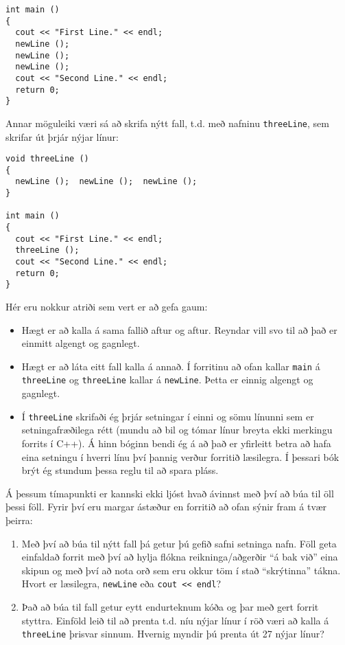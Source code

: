 \begin{verbatim}
int main ()
{
  cout << "First Line." << endl;
  newLine ();
  newLine ();
  newLine ();
  cout << "Second Line." << endl;
  return 0;
}
\end{verbatim}
%
Annar möguleiki væri sá að skrifa nýtt fall, t.d. með nafninu {\tt threeLine}, sem skrifar út þrjár nýjar línur: 

\begin{verbatim}
void threeLine ()
{
  newLine ();  newLine ();  newLine ();
}

int main ()
{
  cout << "First Line." << endl;
  threeLine ();
  cout << "Second Line." << endl;
  return 0;
}
\end{verbatim}
%
Hér eru nokkur atriði sem vert er að gefa gaum:

\begin{itemize}

\item Hægt er að kalla á sama fallið aftur og aftur. Reyndar vill svo til að það er einmitt algengt og gagnlegt.

\item Hægt er að láta eitt fall kalla á annað.
Í forritinu að ofan kallar {\tt main} á {\tt threeLine} og {\tt threeLine} kallar á {\tt newLine}.
Þetta er einnig algengt og gagnlegt. 

\item Í {\tt threeLine} skrifaði ég þrjár setningar í einni og sömu línunni sem er setningafræðilega rétt (mundu að bil og tómar línur breyta ekki merkingu forrits í C++).
Á hinn bóginn bendi ég á að það er yfirleitt betra að hafa eina setningu í hverri línu því þannig verður forritið læsilegra.
Í þessari bók brýt ég stundum þessa reglu til að spara pláss.

\end{itemize}

Á þessum tímapunkti er kannski ekki ljóst hvað ávinnst með því að búa til öll þessi föll.
Fyrir því eru margar ástæður en forritið að ofan sýnir fram á tvær þeirra:

\begin{enumerate}

\item Með því að búa til nýtt fall þá getur þú gefið safni setninga nafn.
Föll geta einfaldað forrit með því að hylja flókna reikninga/aðgerðir ``á bak við'' eina skipun og með því að nota orð sem eru okkur töm í stað ``skrýtinna'' tákna.
Hvort er læsilegra, {\tt newLine} eða {\tt cout << endl}?

\item Það að búa til fall getur eytt endurteknum kóða og þar með gert forrit styttra.
Einföld leið til að prenta t.d. níu nýjar línur í röð væri að kalla á {\tt threeLine} þrisvar sinnum.
Hvernig myndir þú prenta út 27 nýjar línur?

\end{enumerate}

